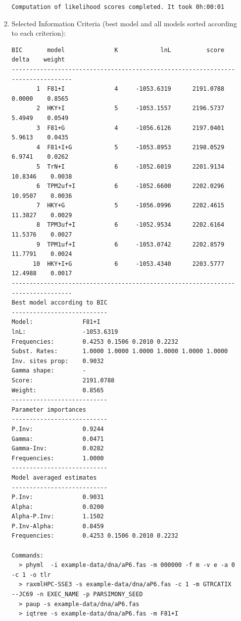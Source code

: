 \begin{enumerate}
\begin{enumerate}
\begin{lstlisting}
Computation of likelihood scores completed. It took 0h:00:01
\end{lstlisting}

\item Selected Information Criteria (best model and all models sorted according to each criterion):

\begin{lstlisting}
BIC       model              K            lnL          score          delta    weight
--------------------------------------------------------------------------------
       1  F81+I              4     -1053.6319      2191.0788         0.0000    0.8565
       2  HKY+I              5     -1053.1557      2196.5737         5.4949    0.0549
       3  F81+G              4     -1056.6126      2197.0401         5.9613    0.0435
       4  F81+I+G            5     -1053.8953      2198.0529         6.9741    0.0262
       5  TrN+I              6     -1052.6019      2201.9134        10.8346    0.0038
       6  TPM2uf+I           6     -1052.6600      2202.0296        10.9507    0.0036
       7  HKY+G              5     -1056.0996      2202.4615        11.3827    0.0029
       8  TPM3uf+I           6     -1052.9534      2202.6164        11.5376    0.0027
       9  TPM1uf+I           6     -1053.0742      2202.8579        11.7791    0.0024
      10  HKY+I+G            6     -1053.4340      2203.5777        12.4988    0.0017
--------------------------------------------------------------------------------
Best model according to BIC
---------------------------
Model:              F81+I
lnL:                -1053.6319
Frequencies:        0.4253 0.1506 0.2010 0.2232
Subst. Rates:       1.0000 1.0000 1.0000 1.0000 1.0000 1.0000
Inv. sites prop:    0.9032
Gamma shape:        -
Score:              2191.0788
Weight:             0.8565
---------------------------
Parameter importances
---------------------------
P.Inv:              0.9244
Gamma:              0.0471
Gamma-Inv:          0.0282
Frequencies:        1.0000
---------------------------
Model averaged estimates
---------------------------
P.Inv:              0.9031
Alpha:              0.0200
Alpha-P.Inv:        1.1502
P.Inv-Alpha:        0.8459
Frequencies:        0.4253 0.1506 0.2010 0.2232

Commands:
  > phyml  -i example-data/dna/aP6.fas -m 000000 -f m -v e -a 0 -c 1 -o tlr
  > raxmlHPC-SSE3 -s example-data/dna/aP6.fas -c 1 -m GTRCATIX --JC69 -n EXEC_NAME -p PARSIMONY_SEED
  > paup -s example-data/dna/aP6.fas
  > iqtree -s example-data/dna/aP6.fas -m F81+I
\end{lstlisting}


\end{enumerate}
\end{enumerate}
